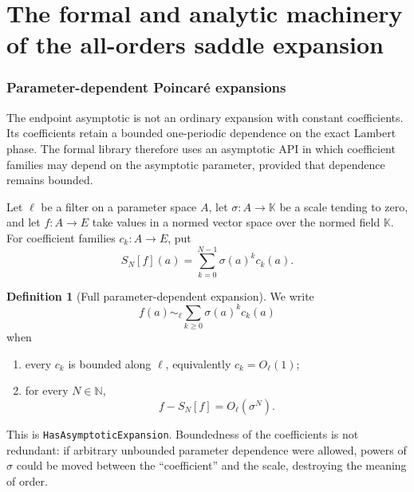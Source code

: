 \documentclass[11pt,oneside]{article}
\theoremstyle{definition}
\newtheorem{definition}[theorem]{Definition}
\theoremstyle{remark}
\newcommand{\N}{\mathbb N}
\newcommand{\lean}[1]{\texttt{#1}}
\begin{document}
\part{The formal and analytic machinery of the all-orders saddle expansion}

\section{Parameter-dependent Poincar\'e expansions}
\label{sec:poincare-api}

The endpoint asymptotic is not an ordinary expansion with constant coefficients.  Its
coefficients retain a bounded one-periodic dependence on the exact Lambert phase.  The
formal library therefore uses an asymptotic API in which coefficient families may depend on
the asymptotic parameter, provided that dependence remains bounded.

Let $\ell$ be a filter on a parameter space $A$, let $\sigma:A\to\mathbb K$ be a scale tending
to zero, and let $f:A\to E$ take values in a normed vector space over the normed field
$\mathbb K$.  For coefficient families $c_k:A\to E$, put
\begin{equation}
 S_N[f](a)=\sum_{k=0}^{N-1}\sigma(a)^k c_k(a).
 \label{eq:parameter-partial-sum}
\end{equation}

\begin{definition}[Full parameter-dependent expansion]
\label{def:parameter-expansion}
We write
\begin{equation}
 f(a)\sim_{\ell}\sum_{k\ge0}\sigma(a)^kc_k(a)
 \label{eq:parameter-expansion-symbol}
\end{equation}
when
\begin{enumerate}
 \item every $c_k$ is bounded along $\ell$, equivalently $c_k=O_{\ell}(1)$;
 \item for every $N\in\N$,
 \begin{equation}
  f-S_N[f]=O_{\ell}(\sigma^N).
  \label{eq:parameter-expansion-remainder}
 \end{equation}
\end{enumerate}
\end{definition}

This is \lean{HasAsymptoticExpansion}.  Boundedness of the coefficients is not redundant: if
arbitrary unbounded parameter dependence were allowed, powers of $\sigma$ could be moved
between the ``coefficient'' and the scale, destroying the meaning of order.
\end{document}
